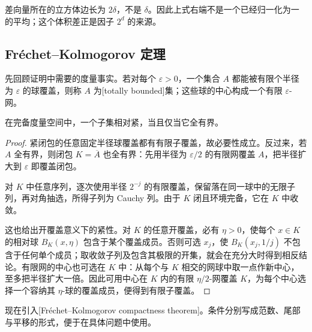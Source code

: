 差向量所在的立方体边长为 \(2\delta\)，不是 \(\delta\)。因此上式右端不是一个已经归一化为一的平均；这个体积差正是因子 \(2^d\) 的来源。

\subsection{Fréchet–Kolmogorov 定理}
\label{b1:subsec:250102}

先回顾证明中需要的度量事实。若对每个 \(\varepsilon>0\)，一个集合 \(A\) 都能被有限个半径为 \(\varepsilon\) 的球覆盖，则称 \(A\) 为[totally bounded]集；这些球的中心构成一个有限 \(\varepsilon\)-网。

\begin{lemma}\label{b1:lem:complete-total-bounded}
在完备度量空间中，一个子集相对紧，当且仅当它全有界。
\end{lemma}
\begin{proof}
紧闭包的任意固定半径球覆盖都有有限子覆盖，故必要性成立。反过来，若 \(A\) 全有界，则闭包 \(K=\overline A\) 也全有界：先用半径为 \(\varepsilon/2\) 的有限网覆盖 \(A\)，把半径扩大到 \(\varepsilon\) 即覆盖闭包。

对 \(K\) 中任意序列，逐次使用半径 \(2^{-j}\) 的有限覆盖，保留落在同一球中的无限子列，再对角抽选，所得子列为 Cauchy 列。由于 \(K\) 闭且环境完备，它在 \(K\) 中收敛。

这也给出开覆盖意义下的紧性。对 \(K\) 的任意开覆盖，必有 \(\eta>0\)，使每个 \(x\in K\) 的相对球 \(B_K(x,\eta)\) 包含于某个覆盖成员。否则可选 \(x_j\)，使 \(B_K(x_j,1/j)\) 不包含于任何单个成员；取收敛子列及包含其极限的开集，就会在充分大时得到相反结论。有限网的中心也可选在 \(K\) 中：从每个与 \(K\) 相交的网球中取一点作新中心，至多把半径扩大一倍。因此可用中心在 \(K\) 内的有限 \(\eta/2\)-网覆盖 \(K\)，为每个中心选择一个容纳其 \(\eta\)-球的覆盖成员，便得到有限子覆盖。
\end{proof}

现在引入[Fréchet--Kolmogorov compactness theorem]。条件分别写成范数、尾部与平移的形式，便于在具体问题中使用。

\ProseParagraphBreak

